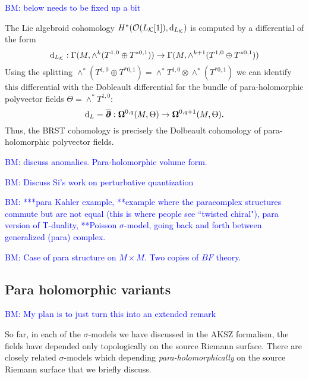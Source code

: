 \documentclass{article}
\newcommand{\KK}{\mathcal{K}}
\newcommand{\cO}{\mathcal{O}}
\newcommand{\p}{\partial}
\newcommand{\pd}{\overline{\p\!\!\!\p}}
\def\d{{\rm d}}
\theoremstyle{definition}
\theoremstyle{remark}
\def\brian{\textcolor{blue}{BM: }\textcolor{blue}}
\begin{document}
\brian{below needs to be fixed up a bit}

The Lie algebroid cohomology $H^*(\cO(L_{\KK}[1]), \d_{L_\KK})$ is computed by a differential of the form
\[
\d_{L_\KK} : \Gamma(M , \wedge^k (T^{1,0} \oplus T^{*0,1})) \to \Gamma(M , \wedge^{k+1} (T^{1,0} \oplus T^{*0,1})) 
\]
Using the splitting $\wedge^*(T^{1,0} \oplus T^{*0,1}) = \wedge^* T^{1,0} \otimes \wedge^*(T^{*0,1})$ we can identify this differential with the Dobleault differential for the bundle of para-holomorphic polyvector fields $\Theta = \wedge^* T^{1,0}$:
\[
\d_L = \pd : \mathbf{\Omega}^{0,q} (M , \Theta) \to \mathbf{\Omega}^{0,q+1} (M , \Theta)  .
\]
Thus, the BRST cohomology is precisely the Dolbeault cohomology of para-holomorphic polyvector fields.

\brian{discuss anomalies. Para-holomorphic volume form.}

\brian{Discuss Si's work on perturbative quantization}


\hrulefill

\brian{***para Kahler example, **example where the paracomplex structures commute but are not equal (this is where people see ``twisted chiral"), para version of T-duality, **Poisson $\sigma$-model, going back and forth between generalized (para) complex.
}  

\brian{Case of para structure on $M \times M$. Two copies of $BF$ theory.}

\subsection{Para holomorphic variants}

\brian{My plan is to just turn this into an extended remark}

So far, in each of the $\sigma$-models we have discussed in the AKSZ formalism, the fields have depended only topologically on the source Riemann surface. 
There are closely related $\sigma$-models which depending {\em para-holomorphically} on the source Riemann surface that we briefly discuss. 



\end{document}
